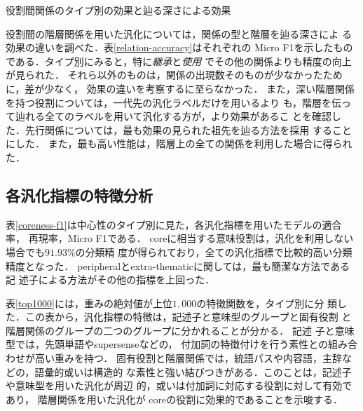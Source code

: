 \documentclass[japanese]{jnlp_1.4}
\begin{document}
\begin{table}[t]
\caption{役割間関係のタイプ別の効果と辿る深さによる効果}
\label{relation-accuracy}

\end{table}

役割間の階層関係を用いた汎化については，関係の型と階層を辿る深さによ
る効果の違いを調べた．表\ref{relation-accuracy}はそれぞれの
Micro F1を示したものである．タイプ別にみると，特に{\it 継承}と{\it 使用}
でその他の関係よりも精度の向上が見られた．
それら以外のものは，関係の出現数そのものが少なかったために，差が少なく，
効果の違いを考察するに至らなかった．
また，深い階層関係を持つ役割については，一代先の汎化ラベルだけを用いるより
も，階層を伝って辿れる全てのラベルを用いて汎化する方が，より効果があるこ
とを確認した．先行関係については，最も効果の見られた祖先を辿る方法を採用
することにした．
また，最も高い性能は，階層上の全ての関係を利用した場合に得られた．


\subsection{各汎化指標の特徴分析}

\begin{table}[b]
\begin{minipage}[t]{195pt}
\setlength{\captionwidth}{195pt}
\label{coreness-f1}

\end{minipage}
\hfill
\begin{minipage}[t]{210pt}
\setlength{\captionwidth}{210pt}
\label{top1000} 

\end{minipage}
\end{table}


表\ref{coreness-f1}は中心性のタイプ別に見た，各汎化指標を用いたモデルの適合率，
再現率，Micro F1である．
coreに相当する意味役割は，汎化を利用しない場合でも$91.93\%$の分類精
度が得られており，全ての汎化指標で比較的高い分類精度となった．
peripheralとextra-thematicに関しては，最も簡潔な方法である記
述子による方法がその他の指標を上回った．

表\ref{top1000}には，重みの絶対値が上位$1,000$の特徴関数を，タイプ別に分
類した．この表から，汎化指標の特徴は，記述子と意味型のグループと固有役割
と階層関係のグループの二つのグループに分かれることが分かる． 記述
子と意味型では，先頭単語やsupersenseなどの，
付加詞の特徴付けを行う素性との組み合わせが高い重みを持つ．
固有役割と階層関係では，統語パスや内容語，主辞などの，語彙的或いは構造的
な素性と強い結びつきがある．このことは，記述子や意味型を用いた汎化が周辺
的，或いは付加詞に対応する役割に対して有効であり， 階層関係を用いた汎化が
coreの役割に効果的であることを示唆する．
\end{document}
